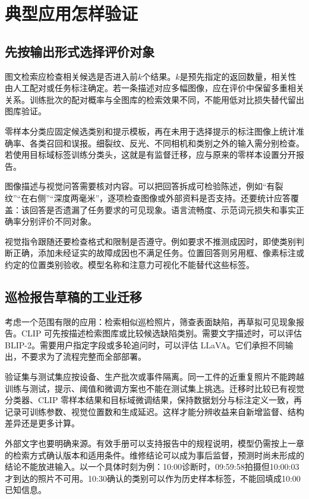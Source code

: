 \section{典型应用怎样验证}
\subsection{先按输出形式选择评价对象}
图文检索应检查相关候选是否进入前$k$个结果。$k$是预先指定的返回数量，相关性由人工配对或任务标注确定。若一条描述对应多幅图像，应在评价中保留多重相关关系。训练批次的配对概率与全图库的检索效果不同，不能用低对比损失替代留出图库验证。

零样本分类应固定候选类别和提示模板，再在未用于选择提示的标注图像上统计准确率、各类召回和误报。细裂纹、反光、不同相机和类别之外的输入需分别检查。若使用目标域标签训练分类头，这就是有监督迁移，应与原来的零样本设置分开报告。

图像描述与视觉问答需要核对内容。可以把回答拆成可检验陈述，例如“有裂纹”“在右侧”“深度两毫米”，逐项检查图像或外部资料是否支持。还要统计应答覆盖：该回答是否遗漏了任务要求的可见现象。语言流畅度、示范词元损失和事实正确率分别评价不同对象。

视觉指令跟随还要检查格式和限制是否遵守。例如要求不推测成因时，即使类别判断正确，添加未经证实的故障成因也不满足任务。位置回答则另用框、像素标注或约定的位置类别验收。模型名称和注意力可视化不能替代这些标签。

\subsection{巡检报告草稿的工业迁移}
考虑一个范围有限的应用：检索相似巡检照片，筛查表面缺陷，再草拟可见现象报告。CLIP 可先按描述检索图库或比较候选缺陷类别。需要文字描述时，可以评估 BLIP-2。需要用户指定字段或多轮追问时，可以评估 LLaVA。它们承担不同输出，不要求为了流程完整而全部部署。

验证集与测试集应按设备、生产批次或事件隔离。同一工件的近重复照片不能跨越训练与测试，提示、阈值和微调方案也不能在测试集上挑选。迁移时比较已有视觉分类器、CLIP 零样本结果和目标域微调结果，保持数据划分与标注定义一致，再记录可训练参数、视觉位置数和生成延迟。这样才能分辨收益来自新增监督、结构差异还是更多计算。

外部文字也要明确来源。有效手册可以支持报告中的规程说明，模型仍需按上一章的检索方式确认版本和适用条件。维修结论可以成为事后监督，预测时尚未形成的结论不能放进输入。以一个具体时刻为例：10:00诊断时，09:59:58拍摄但10:00:03才到达的照片不可用。10:30确认的类别可以作为历史样本标签，不能回填成10:00已知信息。

